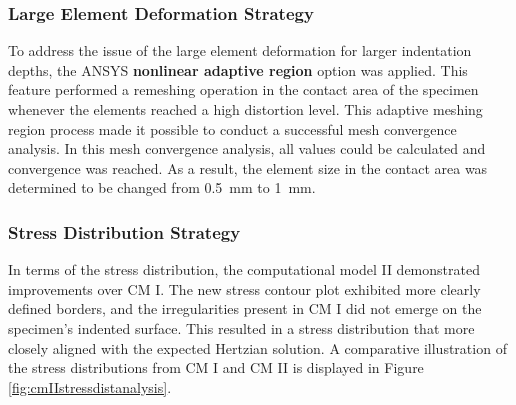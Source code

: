 \subsubsection*{Large Element Deformation Strategy}
To address the issue of the large element deformation for larger indentation depths, the ANSYS \textbf{nonlinear adaptive region}
option was applied. This feature performed a remeshing operation in the contact area of the specimen whenever 
the elements reached a high distortion level. This adaptive meshing region process made it possible to conduct 
a successful mesh convergence analysis. In this mesh convergence analysis, all values could be calculated and 
convergence was reached. As a result, the element size in the contact area was determined to be changed from 
\SI{0.5}{\milli\meter} to \SI{1}{\milli\meter}. 

\subsubsection*{Stress Distribution Strategy}
In terms of the stress distribution, the computational model II demonstrated improvements over CM I. The new
stress contour plot exhibited more clearly defined borders, and the irregularities present in CM I did not 
emerge on the specimen's indented surface. This resulted in a stress distribution that more closely aligned
with the expected Hertzian solution. A comparative illustration of the stress distributions from CM I and 
CM II is displayed in Figure \ref{fig:cmIIstressdistanalysis}.\\

